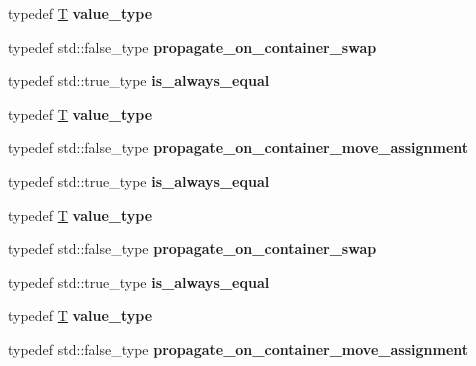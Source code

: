 \begin{DoxyCompactItemize}
typedef \mbox{\hyperlink{struct_t}{T}} {\bfseries value\+\_\+type}
\item 
\mbox{\label{structsome__alloc2_ad1d285ccc9f402a42deed26170af62e9}} 
typedef std\+::false\+\_\+type {\bfseries propagate\+\_\+on\+\_\+container\+\_\+swap}
\item 
\mbox{\label{structsome__alloc2_acc5ede9dcfed27470598992af2c07bfb}} 
typedef std\+::true\+\_\+type {\bfseries is\+\_\+always\+\_\+equal}
\item 
\mbox{\label{structsome__alloc2_ab7bdd83edbd79faad769611dbbd19a5e}} 
typedef \mbox{\hyperlink{struct_t}{T}} {\bfseries value\+\_\+type}
\item 
\mbox{\label{structsome__alloc2_a2bb8a30b2f6202260c0f4935a01bd5ad}} 
typedef std\+::false\+\_\+type {\bfseries propagate\+\_\+on\+\_\+container\+\_\+move\+\_\+assignment}
\item 
\mbox{\label{structsome__alloc2_acc5ede9dcfed27470598992af2c07bfb}} 
typedef std\+::true\+\_\+type {\bfseries is\+\_\+always\+\_\+equal}
\item 
\mbox{\label{structsome__alloc2_ab7bdd83edbd79faad769611dbbd19a5e}} 
typedef \mbox{\hyperlink{struct_t}{T}} {\bfseries value\+\_\+type}
\item 
\mbox{\label{structsome__alloc2_ad1d285ccc9f402a42deed26170af62e9}} 
typedef std\+::false\+\_\+type {\bfseries propagate\+\_\+on\+\_\+container\+\_\+swap}
\item 
\mbox{\label{structsome__alloc2_acc5ede9dcfed27470598992af2c07bfb}} 
typedef std\+::true\+\_\+type {\bfseries is\+\_\+always\+\_\+equal}
\item 
\mbox{\label{structsome__alloc2_ab7bdd83edbd79faad769611dbbd19a5e}} 
typedef \mbox{\hyperlink{struct_t}{T}} {\bfseries value\+\_\+type}
\item 
\mbox{\label{structsome__alloc2_a2bb8a30b2f6202260c0f4935a01bd5ad}} 
typedef std\+::false\+\_\+type {\bfseries propagate\+\_\+on\+\_\+container\+\_\+move\+\_\+assignment}

\end{DoxyCompactItemize}
